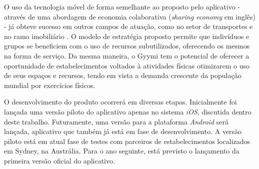 O uso da tecnologia móvel de forma semelhante ao proposto pelo aplicativo - através de uma abordagem de economia colaborativa (\textit{sharing economy} em inglês) - já obteve sucesso em outros campos de atuação, como no setor de transportes e no ramo imobiliário \cite{sharing-economy}. O modelo de estratégia proposto permite que indivíduos e grupos se beneficiem com o uso de recursos subutilizados, oferecendo os mesmos na forma de serviço. Da mesma maneira, o Gyymi tem o potencial de oferecer a oportunidade de estabelecimentos voltados à atividades físicas otimizarem o uso de seus espaços e recursos, tendo em vista a demanda crescente da população mundial por exercícios físicos.

O desenvolvimento do produto ocorrerá em diversas etapas. Inicialmente foi lançada uma versão piloto do aplicativo apenas no sistema \textit{iOS}, discutida dentro deste trabalho. Futuramente, uma versão para a plataforma \textit{Android} será lançada, aplicativo que também já está em fase de desenvolvimento. A versão piloto está em atual fase de testes com parceiros de estabelecimentos localizados em Sydney, na Austrália. Para o ano seguinte, está previsto o lançamento da primeira versão oficial do aplicativo.
